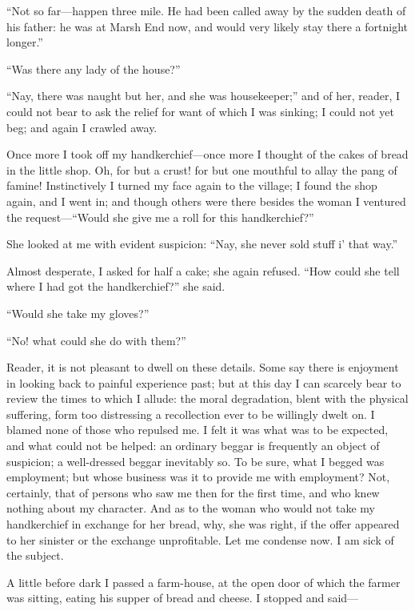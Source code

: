 \enquote{Not so far---happen three mile. He had been called away by the
	sudden death of his father: he was at Marsh End now, and would very
	likely stay there a fortnight longer.}

\enquote{Was there any lady of the house?}

\enquote{Nay, there was naught but her, and she was housekeeper;} and of
her, reader, I could not bear to ask the relief for want of which I was
sinking; I could not yet beg; and again I crawled away.

Once more I took off my handkerchief---once more I thought of the cakes
of bread in the little shop. Oh, for but a crust! for but one mouthful
to allay the pang of famine! Instinctively I turned my face again to
the village; I found the shop again, and I went in; and though others
were there besides the woman I ventured the request---\enquote{Would she
	give me a roll for this handkerchief?}

She looked at me with evident suspicion: \enquote{Nay, she never sold
	stuff i' that way.}

Almost desperate, I asked for half a cake; she again refused.
\enquote{How could she tell where I had got the handkerchief?} she said.

\enquote{Would she take my gloves?}

\enquote{No! what could she do with them?}

Reader, it is not pleasant to dwell on these details. Some say there is
enjoyment in looking back to painful experience past; but at this day I
can scarcely bear to review the times to which I allude: the moral
degradation, blent with the physical suffering, form too distressing a
recollection ever to be willingly dwelt on. I blamed none of those who
repulsed me. I felt it was what was to be expected, and what could not
be helped: an ordinary beggar is frequently an object of suspicion; a
well-dressed beggar inevitably so. To be sure, what I begged was
employment; but whose business was it to provide me with employment?
Not, certainly, that of persons who saw me then for the first time, and
who knew nothing about my character. And as to the woman who would not
take my handkerchief in exchange for her bread, why, she was right, if
the offer appeared to her sinister or the exchange unprofitable. Let me
condense now. I am sick of the subject.

A little before dark I passed a farm-house, at the open door of which
the farmer was sitting, eating his supper of bread and cheese. I
stopped and said---

